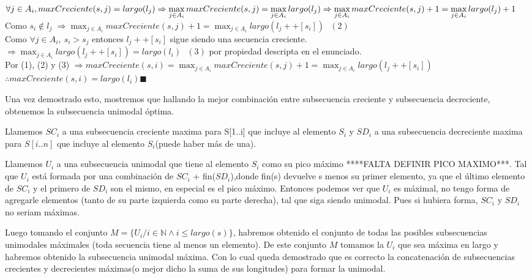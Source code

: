 $ \displaystyle \forall j \in A_i , maxCreciente(s,j) = largo(l_j) \\
 \Rightarrow \max_{j \in A_i} {maxCreciente(s,j)} = \max_{j \in A_i} {largo(l_j)} \\
 \Rightarrow \max_{j \in A_i} {maxCreciente(s,j) + 1} = \max_{j \in A_i} {largo(l_j) + 1}$ \\
Como $s_i  \notin l_j$
$\displaystyle \Rightarrow \max_{j \in A_i} {maxCreciente(s,j) + 1} = \max_{j \in A_i} {largo(l_j ++ [s_i])} \ \ \ (2)$ \\
Como $\forall j \in A_i,\ s_i > s_j$ entonces $l_j ++ [s_i]$  sigue siendo una secuencia creciente.\\
$\displaystyle \Rightarrow \max_{j \in A_i} {largo(l_j ++ [s_i])} = largo(l_i)\ \ \ (3) $ por propiedad descripta en el enunciado. \\ 
Por (1), (2) y (3)      
$\displaystyle \Rightarrow maxCreciente(s, i) = \max_{j \in A_i} {maxCreciente(s,j) + 1} = \max_{j \in A_i} {largo(l_j ++ [s_i])}$ \\
$\displaystyle \therefore maxCreciente(s, i) = largo(l_i) \blacksquare$ 

Una vez demostrado esto, mostremos que hallando la mejor combinación entre subsecuencia creciente y subsecuencia decreciente, obtenemos la subsecuencia unimodal óptima. 


Llamemos $SC_i$ a una subsecuencia creciente maxima para S[1..i] que incluye al elemento $S_i$ y $SD_i$ a una subsecuencia decreciente maxima para $S[i..n]$ que incluye al elemento $S_i$(puede haber más de una).

Llamemos $U_i$ a una subsecuencia unimodal que tiene al elemento $S_i$ como su pico máximo ****FALTA DEFINIR PICO MAXIMO***.
Tal que $U_i$ está formada por una combinación de $SC_i$ + fin($SD_i$),donde fin(s) devuelve s menos su primer elemento, ya que el último elemento de $SC_i$ y el primero de $SD_i$ son el mismo, en especial es el pico máximo. Entonces podemos ver que $U_i$ es máximal, no tengo forma de agregarle elementos (tanto de su parte izquierda como su parte derecha), tal que siga siendo unimodal. Pues si hubiera forma, $SC_i$ y $SD_i$ no seriam máximas.

Luego tomando el conjunto $M = \{U_i / i \in \mathbb{N} \land i \le largo(s)\}$, habremos obtenido el conjunto de todas las posibles subsecuencias unimodales máximales (toda secuencia tiene al menos un elemento). De este conjunto $M$ tomamos la $U_i$ que sea máxima en largo y habremos obtenido la subsecuencia unimodal máxima. Con lo cual queda demostrado que es correcto la concatenación de subsecuencias crecientes y decrecientes máximas(o mejor dicho la suma de sus longitudes) para formar la unimodal.
